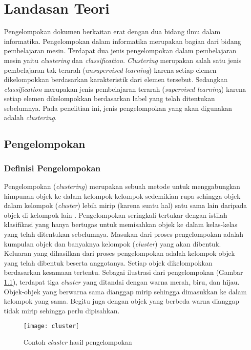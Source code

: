 \chapter{Landasan Teori}
\label{chap:teori}

Pengelompokan dokumen berkaitan erat dengan dua bidang ilmu dalam informatika. Pengelompokan dalam informatika merupakan bagian dari bidang pembelajaran mesin. Terdapat dua jenis pengelompokan dalam pembelajaran mesin yaitu \textit{clustering} dan \textit{classification}. \textit{Clustering} merupakan salah satu jenis pembelajaran tak terarah (\textit{unsupervised learning}) karena setiap elemen dikelompokkan berdasarkan karakteristik dari elemen tersebut. Sedangkan \textit{classification} merupakan jenis pembelajaran terarah (\textit{supervised learning}) karena setiap elemen dikelompokkan berdasarkan label yang telah ditentukan sebelumnya. Pada penelitian ini, jenis pengelompokan yang akan digunakan adalah \textit{clustering}.

\section{Pengelompokan}
\subsection{Definisi Pengelompokan}
Pengelompokan (\textit{clustering}) merupakan sebuah metode untuk menggabungkan himpunan objek ke dalam kelompok-kelompok sedemikian rupa sehingga objek dalam kelompok (\textit{cluster}) lebih mirip (karena suatu hal) satu sama lain daripada objek di kelompok lain \cite{gan2007data}. Pengelompokan seringkali tertukar dengan istilah klasifikasi yang hanya bertugas untuk memisahkan objek ke dalam kelas-kelas yang telah ditentukan sebelumnya. Masukan dari proses pengelompokan adalah kumpulan objek dan banyaknya kelompok (\textit{cluster}) yang akan dibentuk. Keluaran yang dihasilkan dari proses pengelompokan adalah kelompok objek yang telah dibentuk beserta anggotanya. Setiap objek dikelompokkan berdasarkan kesamaan tertentu. Sebagai ilustrasi dari pengelompokan (Gambar \ref{fig:cluster}), terdapat tiga \textit{cluster} yang ditandai dengan warna merah, biru, dan hijau. Objek-objek yang berwarna sama dianggap mirip sehingga dimasukkan ke dalam kelompok yang sama. Begitu juga dengan objek yang berbeda warna dianggap tidak mirip sehingga perlu dipisahkan.

\begin{figure}[h]
	\begin{center}
		\texttt{[image: cluster]}
		\caption{Contoh \textit{cluster} hasil pengelompokan}
		\label{fig:cluster}
	\end{center}
\end{figure}

